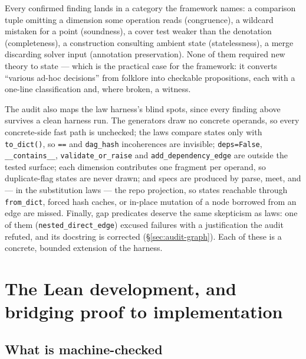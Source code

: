 \documentclass[11pt]{article}
\theoremstyle{definition}
\theoremstyle{remark}
\newcommand{\code}[1]{\texttt{#1}}
\begin{document}
Every confirmed finding lands in a category the framework names: a
comparison tuple omitting a dimension some operation reads (congruence), a
wildcard mistaken for a point (soundness), a cover test weaker than the
denotation (completeness), a construction consulting ambient state
(statelessness), a merge discarding solver input (annotation preservation).
None of them required new theory to state --- which is the practical case
for the framework: it converts ``various ad-hoc decisions'' from folklore
into checkable propositions, each with a one-line classification and, where
broken, a witness.

The audit also maps the law harness's blind spots, since every finding above
survives a clean harness run.  The generators draw no concrete operands, so
every concrete-side fast path is unchecked; the laws compare states only
with \code{to\_dict()}, so \code{==} and \code{dag\_hash} incoherences are
invisible; \code{deps=False}, \code{\_\_contains\_\_},
\code{validate\_or\_raise} and \code{add\_dependency\_edge} are outside the
tested surface; each dimension contributes one fragment per operand, so
duplicate-flag states are never drawn; and specs are produced by parse,
meet, and --- in the substitution laws --- the repo projection, so states
reachable through \code{from\_dict}, forced hash caches, or in-place
mutation of a node borrowed from an edge are missed.  Finally, gap
predicates deserve the same skepticism as laws: one of them
(\code{nested\_direct\_edge}) excused failures with a justification the
audit refuted, and its docstring is corrected
(\S\ref{sec:audit-graph}).  Each of these is a concrete, bounded
extension of the harness.

\section{The Lean development, and bridging proof to implementation}
\label{sec:lean}

\subsection{What is machine-checked}
\end{document}
